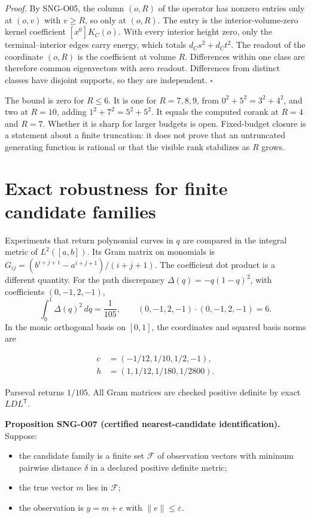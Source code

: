 \documentclass[
  11pt,
  a4paper,
]{report}
\providecommand{\tightlist}{%
  \setlength{\itemsep}{0pt}\setlength{\parskip}{0pt}}
\begin{document}
\emph{Proof.} By SNG-O05, the column \((o,R)\) of the operator has
nonzero entries only at \((o,v)\) with \(v\ge R\), so only at \((o,R)\).
The entry is the interior-volume-zero kernel coefficient
\([x^0]K_C(o)\). With every interior height zero, only the
terminal--interior edges carry energy, which totals \(d_Cs^2+d_Ct^2\).
The readout of the coordinate \((o,R)\) is the coefficient at volume
\(R\). Differences within one class are therefore common eigenvectors
with zero readout. Differences from distinct classes have disjoint
supports, so they are independent. \(\square\)

The bound is zero for \(R\le6\). It is one for \(R=7,8,9\), from
\(0^2+5^2=3^2+4^2\), and two at \(R=10\), adding \(1^2+7^2=5^2+5^2\). It
equals the computed corank at \(R=4\) and \(R=7\). Whether it is sharp
for larger budgets is open. Fixed-budget closure is a statement about a
finite truncation: it does not prove that an untruncated generating
function is rational or that the visible rank stabilizes as \(R\) grows.

\hypertarget{exact-robustness-for-finite-candidate-families}{%
\section{Exact robustness for finite candidate
families}\label{exact-robustness-for-finite-candidate-families}}

Experiments that return polynomial curves in \(q\) are compared in the
integral metric of \(L^2([a,b])\). Its Gram matrix on monomials is
\(G_{ij}=(b^{i+j+1}-a^{i+j+1})/(i+j+1)\). The coefficient dot product is
a different quantity. For the path discrepancy \(\Delta(q)=-q(1-q)^2\),
with coefficients \((0,-1,2,-1)\), \[
\int_0^1\Delta(q)^2\,dq=\frac1{105},\qquad (0,-1,2,-1)\cdot(0,-1,2,-1)=6 .
\] In the monic orthogonal basis on \([0,1]\), the coordinates and
squared basis norms are

\[
\begin{aligned}
c&=(-1/12,1/10,1/2,-1),\\
h&=(1,1/12,1/180,1/2800).
\end{aligned}
\]

Parseval returns \(1/105\). All Gram matrices are checked positive
definite by exact \(LDL^{\mathsf T}\).

\textbf{Proposition SNG-O07 (certified nearest-candidate
identification).} Suppose:

\begin{itemize}
\tightlist
\item
  the candidate family is a finite set \(\mathcal F\) of observation
  vectors with minimum pairwise distance \(\delta\) in a declared
  positive definite metric;
\item
  the true vector \(m\) lies in \(\mathcal F\);
\item
  the observation is \(y=m+e\) with \(\|e\|\le\varepsilon\).
\end{itemize}
\end{document}

